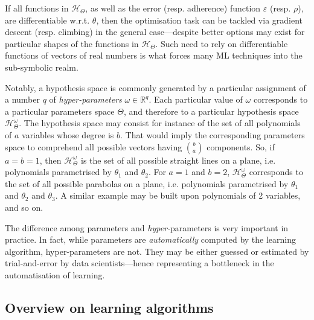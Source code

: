\documentclass[12pt,a4paper,openright,twoside]{book}
\begin{document}
If all functions in $\mathcal{H}_\Theta$, as well as the error (resp. adherence) function $\varepsilon$ (resp. $\rho$), are differentiable w.r.t. $\theta$, then the optimisation task can be tackled via gradient descent (resp. climbing) in the general case---despite better options may exist for particular shapes of the functions in $\mathcal{H}_\Theta$.
%
Such need to rely on differentiable functions of vectors of real numbers is what forces many ML techniques into the sub-symbolic realm.

Notably, a hypothesis space is commonly generated by a particular assignment of a number $q$ of \emph{hyper-parameters} $\omega \in \mathbb{R}^q$.
%
Each particular value of $\omega$ corresponds to a particular parameters space $\Theta$, and therefore to a particular hypothesis space $\mathcal{H}_\Theta^\omega$.
%
The hypothesis space may consist for instance of the set of all polynomials of $a$ variables whose degree is $b$.
%
That would imply the corresponding parameters space to comprehend all possible vectors having $\binom{b}{a}$ components.
%
So, if $a = b = 1$, then $\mathcal{H}_\Theta^\omega$ is the set of all possible straight lines on a plane, i.e. polynomials parametrised by $\theta_1$ and $\theta_2$.
%
For $a = 1$ and $b = 2$, $\mathcal{H}_\Theta^\omega$ corresponds to the set of all possible parabolas on a plane, i.e. polynomials parametrised by $\theta_1$ and $\theta_2$ and $\theta_3$.
%
A similar example may be built upon polynomials of 2 variables, and so on.

The difference among parameters and \emph{hyper-}parameters is very important in practice.
%
In fact, while parameters are \emph{automatically} computed by the learning algorithm, hyper-parameters are not.
%
They may be either guessed or estimated by trial-and-error by data scientists---hence representing a bottleneck in the automatisation of learning.


\subsection{Overview on learning algorithms}

\end{document}
